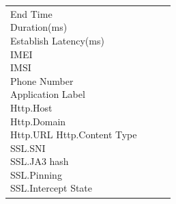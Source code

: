 \begin{description}
\begin{longtable}{p{}|p{}|p{}|p{}}
{                                                                                                                            End Time\\
                                                                                                                            Duration(ms)\\
                                                                                                                            Establish Latency(ms)\\
                                                                                                                            IMEI\\
                                                                                                                            IMSI\\
                                                                                                                            Phone Number\\
                                                                                                                            Application Label\\
                                                                                                                            Http.Host\\
                                                                                                                            Http.Domain\\
                                                                                                                            Http.URL
                                                                                                                            Http.Content Type\\
                                                                                                                            SSL.SNI \\
                                                                                                                            SSL.JA3 hash\\
                                                                                                                            SSL.Pinning\\
                                                                                                                            SSL.Intercept State\\
}
\end{longtable}
\end{description}
